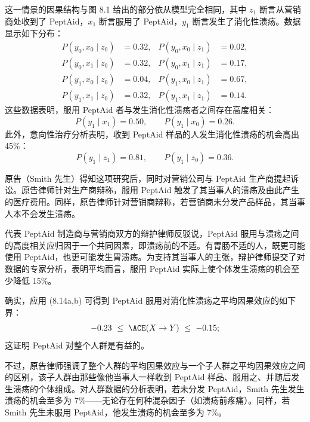 这一情景的因果结构与图 8.1 给出的部分依从模型完全相同，其中 $z_1$ 断言从营销商处收到了 PeptAid，$x_1$ 断言服用了 PeptAid，$y_1$ 断言发生了消化性溃疡。数据显示如下分布：
\begin{align*}
P(y_0,x_0\mid z_0)&=0.32, & P(y_0,x_0\mid z_1)&=0.02,\\
P(y_0,x_1\mid z_0)&=0.32, & P(y_0,x_1\mid z_1)&=0.17,\\
P(y_1,x_0\mid z_0)&=0.04, & P(y_1,x_0\mid z_1)&=0.67,\\
P(y_1,x_1\mid z_0)&=0.32, & P(y_1,x_1\mid z_1)&=0.14.
\end{align*}
这些数据表明，服用 PeptAid 者与发生消化性溃疡者之间存在高度相关：
\[
P(y_1\mid x_1)=0.50,\qquad P(y_1\mid x_0)=0.26.
\]
此外，意向性治疗分析表明，收到 PeptAid 样品的人发生消化性溃疡的机会高出 45\%：
\[
P(y_1\mid z_1)=0.81,\qquad P(y_1\mid z_0)=0.36.
\]

原告（Smith 先生）得知这项研究后，同时对营销公司与 PeptAid 生产商提起诉讼。原告律师针对生产商辩称，服用 PeptAid 触发了其当事人的溃疡及由此产生的医疗费用。同样，原告律师针对营销商辩称，若营销商未分发产品样品，其当事人本不会发生溃疡。

代表 PeptAid 制造商与营销商双方的辩护律师反驳说，PeptAid 服用与溃疡之间的高度相关应归因于一个共同因素，即溃疡前的不适。有胃肠不适的人，既更可能使用 PeptAid，也更可能发生胃溃疡。为支持其当事人的主张，辩护律师提交了对数据的专家分析，表明平均而言，服用 PeptAid 实际上使个体发生溃疡的机会至少降低 15\%。

确实，应用 \textup{(8.14a,b)} 可得到 PeptAid 服用对消化性溃疡之平均因果效应的如下界：
\[
-0.23\ \le\ \ACE(X\to Y)\ \le\ -0.15;
\]
这证明 PeptAid 对整个人群是有益的。

不过，原告律师强调了整个人群的平均因果效应与一个子人群之平均因果效应之间的区别，该子人群由那些像他当事人一样收到 PeptAid 样品、服用之、并随后发生溃疡的个体组成。对人群数据的分析表明，若未分发 PeptAid，Smith 先生发生溃疡的机会至多为 7\%——无论存在何种混杂因子（如溃疡前疼痛）。同样，若 Smith 先生未服用 PeptAid，他发生溃疡的机会至多为 7\%。

